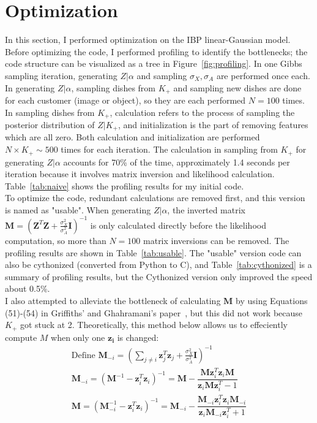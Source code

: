 \section{Optimization}
In this section, I performed optimization on the IBP linear-Gaussian model. Before optimizing the code, I performed profiling to identify the bottlenecks; the code structure can be visualized as a tree in Figure~\ref{fig:profiling}. In one Gibbs sampling iteration, generating $Z|\alpha$ and sampling $\sigma_X,\sigma_A$ are performed once each. In generating $Z|\alpha$, sampling dishes from $K_+$ and sampling new dishes are done for each customer (image or object), so they are each performed $N=100$ times. In sampling dishes from $K_+$, calculation refers to the process of sampling the posterior distribution of $Z|K_+$, and initialization is the part of removing features which are all zero. Both calculation and initialization are performed $N\times K_+ \sim 500$ times for each iteration. The calculation in sampling from $K_+$ for generating $Z|\alpha$ accounts for 70\% of the time, approximately 1.4 seconds per iteration because it involves matrix inversion and likelihood calculation. Table~\ref{tab:naive} shows the profiling results for my initial code. \\

To optimize the code, redundant calculations are removed first, and this version is named as "usable". When generating $Z|\alpha$, the inverted matrix $\mathbf{M} = (\mathbf{Z}^T\mathbf{Z}+\frac{\sigma_X^2}{\sigma_A^2}\mathbf{I})^{-1}$ is only calculated directly before the likelihood computation, so more than $N = 100$ matrix inversions can be removed. The profiling results are shown in Table~\ref{tab:usable}. The "usable" version code can also be cythonized (converted from Python to C), and Table~\ref{tab:cythonized} is a summary of profiling results, but the Cythonized version only improved the speed about 0.5\%.\\

I also attempted to alleviate the bottleneck of calculating $\mathbf{M}$ by using Equations (51)-(54) in Griffiths' and Ghahramani's paper~\cite{griffiths2005detailed}, but this did not work because $K_+$ got stuck at 2. Theoretically, this method below allows us to effeciently compute $M$ when only one $\mathbf{z_i}$ is changed:
\begin{gather}
\text{Define } \mathbf{M}_{-i} = (\sum_{j \neq i}\mathbf{z}^T_j \mathbf{z}_j + \frac{\sigma_X^2}{\sigma_A^2}\mathbf{I})^{-1} \\
\mathbf{M}_{-i} = (\mathbf{M}^{-1} - \mathbf{z}^T_i \mathbf{z}_i)^{-1} 
= \mathbf{M} - \dfrac{\mathbf{M}\mathbf{z}^T_i \mathbf{z}_i\mathbf{M}}{\mathbf{z}_i\mathbf{M}\mathbf{z}^T_i - 1} \\
\mathbf{M} = (\mathbf{M}_{-i}^{-1} - \mathbf{z}^T_i \mathbf{z}_i)^{-1} 
= \mathbf{M}_{-i} - \dfrac{\mathbf{M}_{-i}\mathbf{z}^T_i \mathbf{z}_i\mathbf{M}_{-i}}{\mathbf{z}_i\mathbf{M}_{-i}\mathbf{z}^T_i + 1}
\end{gather}

